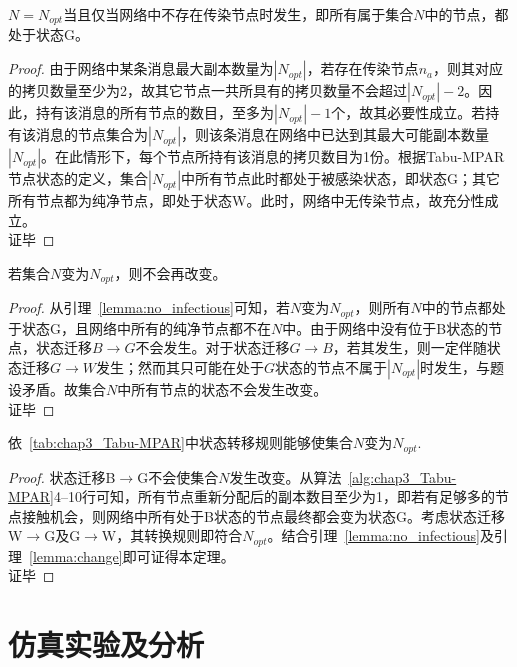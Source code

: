 \begin{lemma}
$N=N_{opt}$当且仅当网络中不存在传染节点时发生，即所有属于集合$N$中的节点，都处于状态G。
\label{lemma:no_infectious}
\end{lemma}
\begin{proof}
由于网络中某条消息最大副本数量为$|N_{opt}|$，若存在传染节点$n_a$，则其对应的拷贝数量至少为2，故其它节点一共所具有的拷贝数量不会超过$|N_{opt}|-2$。因此，持有该消息的所有节点的数目，至多为$|N_{opt}|-1$个，故其必要性成立。若持有该消息的节点集合为$|N_{opt}|$，则该条消息在网络中已达到其最大可能副本数量$|N_{opt}|$。在此情形下，每个节点所持有该消息的拷贝数目为1份。根据Tabu-MPAR节点状态的定义，集合$|N_{opt}|$中所有节点此时都处于被感染状态，即状态G；其它所有节点都为纯净节点，即处于状态W。此时，网络中无传染节点，故充分性成立。\\
证毕
\end{proof}



\begin{lemma}
若集合$N$变为$N_{opt}$，则不会再改变。
\label{lemma:change}
\end{lemma}
\begin{proof}
从引理~\ref{lemma:no_infectious}可知，若$N$变为$N_{opt}$，则所有$N$中的节点都处于状态G，且网络中所有的纯净节点都不在$N$中。由于网络中没有位于B状态的节点，状态迁移$B\rightarrow G$不会发生。对于状态迁移$G\rightarrow B$，若其发生，则一定伴随状态迁移$G\rightarrow W$发生；然而其只可能在处于$G$状态的节点不属于$|N_{opt}|$时发生，与题设矛盾。故集合$N$中所有节点的状态不会发生改变。\\
证毕
\end{proof}

\begin{theorem}
依\tablename~\ref{tab:chap3_Tabu-MPAR}中状态转移规则能够使集合$N$变为$N_{opt}$.
\end{theorem}
\begin{proof}
状态迁移B$\rightarrow$G不会使集合$N$发生改变。从算法~\ref{alg:chap3_Tabu-MPAR}4--10行可知，所有节点重新分配后的副本数目至少为1，即若有足够多的节点接触机会，则网络中所有处于B状态的节点最终都会变为状态G。考虑状态迁移W$\rightarrow$G及G$\rightarrow$W，其转换规则即符合$N_{opt}$。结合引理~\ref{lemma:no_infectious}及引理~\ref{lemma:change}即可证得本定理。\\
证毕
\end{proof}


\section{仿真实验及分析}
\label{chap3:仿真实验}

